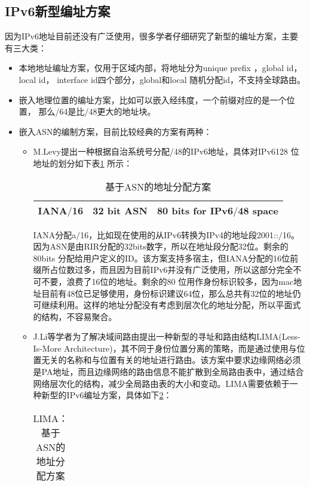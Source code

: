 \subsection{IPv6新型编址方案}
因为IPv6地址目前还没有广泛使用，很多学者仔细研究了新型的编址方案，主要有三大类：
\begin{itemize}
\item 本地地址编址方案\cite{localaddress}，仅用于区域内部，将地址分为unique prefix ，global id， local id， interface id四个部分，global和local 随机分配id，不支持全球路由。
\item 嵌入地理位置的编址方案，比如可以嵌入经纬度，一个前缀对应的是一个位置， 那么/64是比/48更大的地址块。
\item 嵌入ASN的编制方案，目前比较经典的方案有两种：
    \begin{itemize}
    \item M.Levy提出\cite{asnipaddr}一种根据自治系统号分配/48的IPv6地址，具体对IPv6128 位地址的划分如下表\ref{tab:asnaddr} 所示：
    \begin{table}[h]
    \centering
    \caption{基于ASN的地址分配方案}
    \label{tab:asnaddr}
        \begin{tabular}{|c|c|c|}
        \hline
        IANA$/$16 & 32 bit ASN & 80 bits for IPv6$/$48 space\\
        \hline
        \end{tabular}
    \end{table}
    IANA分配a$/$16，比如现在使用的从IPv6转换为IPv4的地址段2001::$/$16。因为ASN是由RIR分配的32bits数字，所以在地址段分配32位。剩余的80bits 分配给用户定义的ID。该方案支持多宿主，但IANA分配的16位前缀所占位数过多，而且因为目前IPv6并没有广泛使用，所以这部分完全不可不要，浪费了16位的地址。剩余的80 位用作身份标识较多，因为mac地址目前有48位已足够使用，身份标识建议64位，那么总共有32位的地址仍可继续利用。这样的地址分配没有考虑到层次化的地址分配，所以平面式的结构，不容易聚合。
    \item J.Li等学者为了解决域间路由提出\cite{lima}一种新型的寻址和路由结构LIMA(Less-Is-More Architecture)，其不同于身份位置分离的策略，而是通过使用与位置无关的名称和与位置有关的地址进行路由。该方案中要求边缘网络必须是PA地址，而且边缘网络的路由信息不能扩散到全局路由表中，通过结合网络层次化的结构，减少全局路由表的大小和变动。LIMA需要依赖于一种新型的IPv6编址方案，具体如下\ref{tab:limaasnaddr}：
    \begin{table}[h]
    \centering
    \caption{LIMA：基于ASN的地址分配方案}
    \label{tab:limaasnaddr}
        \begin{tabular}{|c|c|c|}
        \hline

\end{tabular}
\end{table}
\end{itemize}
\end{itemize}
